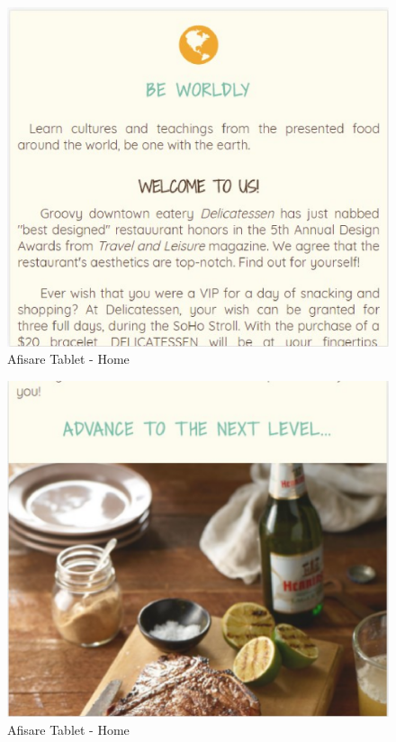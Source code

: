 \documentclass[11pt]{article}
\begin{document}
\begin{figure}[h]
\includegraphics{images/123.eps}
\caption{Afisare Tablet - Home}
\end{figure}

\begin{figure}[h]
\includegraphics{images/124.eps}
\caption{Afisare Tablet - Home}
\end{figure}
\end{document}
